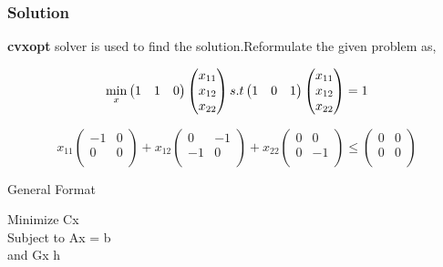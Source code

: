 \documentclass{beamer}
\begin{document}
\begin{frame}
\frametitle{Solution}
\textbf{cvxopt} solver is used to find the solution.Reformulate the given problem as,

\begin{center}
\begin{equation*}
    \min_{x} \begin{pmatrix}
1&1&0\\

\end{pmatrix}\begin{pmatrix}
x_{11}\\
x_{12}\\
x_{22}\\
\end{pmatrix}\\
s.t
\begin{pmatrix}
1&0&1\\

\end{pmatrix}
\begin{pmatrix}
x_{11}\\
x_{12}\\
x_{22}\\
\end{pmatrix}
= 1
\end{equation*}
\end{center}
\begin{equation*}
   x_{11}\begin{pmatrix}
-1&0\\
0&0\\
\end{pmatrix}
+ x_{12}\begin{pmatrix}
0&-1\\
-1&0\\
\end{pmatrix}
+x_{22}\begin{pmatrix}
0&0\\
0&-1\\
\end{pmatrix}
\leq \begin{pmatrix}
0&0\\
0&0\\
\end{pmatrix}
\end{equation*}
\end{frame}



\begin{frame}{General Format}
\begin{center}
Minimize Cx\\
Subject to Ax = b\\
and Gx \leq h\\
\end{center}

\end{frame}
\end{document}
